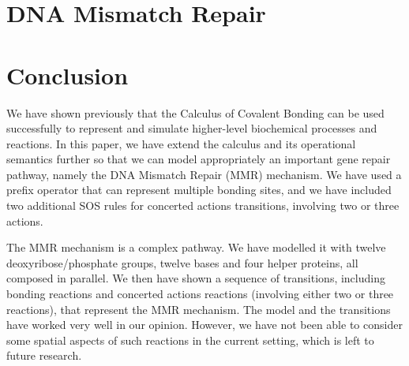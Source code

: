 \documentclass[review]{elsarticle}
\begin{document}
\section{DNA Mismatch Repair}\label{sec:dnamimatch}

%
\section{Conclusion}
We have shown previously that the Calculus of Covalent Bonding can be used successfully to represent and simulate higher-level biochemical processes and reactions. In this paper, we have extend the calculus and its operational semantics further so that we can model appropriately an important gene repair pathway, namely the DNA Mismatch Repair (MMR) mechanism. We have used a prefix operator that can represent 
multiple bonding sites,  and we have included two additional SOS rules for concerted actions transitions, involving two or three actions. 

The MMR mechanism is a complex pathway. We have modelled it with twelve deoxyribose/phosphate groups, twelve bases and four helper proteins, all composed in parallel. We then have shown a sequence of transitions, including bonding reactions and concerted actions reactions (involving either two or three reactions), that represent the MMR mechanism. The model and the transitions have worked very well in our opinion. However, we have not been able to consider some spatial aspects of such reactions in the current setting, which is left to future research.


\end{document}
